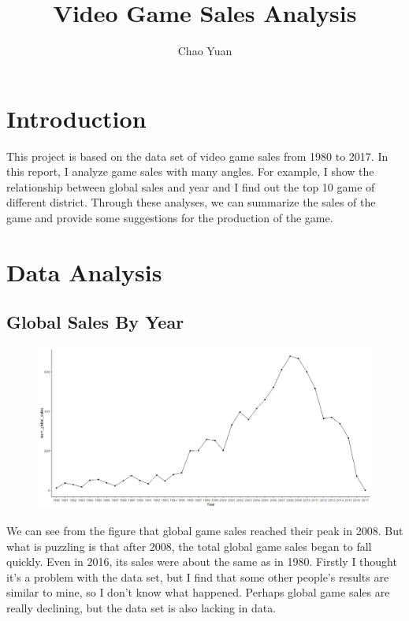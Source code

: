 \documentclass{article}
\title{Video Game Sales Analysis}
\author{Chao Yuan}
\begin{document}
	\maketitle
	\section{Introduction}
	This project is based on the data set of video game sales from 1980 to 2017. In this report, I analyze game sales with many angles. For example, I show the relationship between global sales and year and I find out the top 10 game of different district. Through these analyses, we can summarize the sales of the game and provide some suggestions for the production of the game.
	
	\section{Data Analysis}
	
	\subsection{Global Sales By Year}
	\begin{figure}[H]
	\centering
	\includegraphics[scale = 0.6]{Figures/Year_sales.png}
	\end{figure}

	We can see from the figure that global game sales reached their peak in 2008. But what is puzzling is that after 2008, the total global game sales began to fall quickly. Even in 2016, its sales were about the same as in 1980. Firstly I thought it's a problem with the data set, but I find that some other people's results are similar to mine, so I don't know what happened. Perhaps global game sales are really declining, but the data set is also lacking in data.
\end{document}
